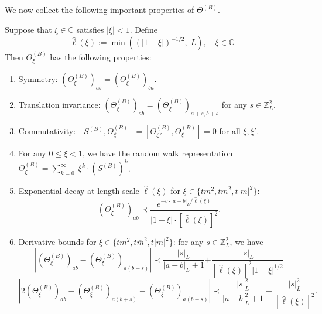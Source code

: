 We now collect the following important properties of $\Theta^{(B)}$. 
\begin{lemma}\label{lem_propTH}
Suppose that  $\xi\in \mathbb C$ satisfies $|\xi|< 1$.  Define
$$
 \hat{\ell}(\xi) := \min\left((|1-\xi|)^{-1/2},\; L\right),\quad \xi\in \mathbb C 
$$
Then  $\Theta^{(B)}_\xi$ has the following properties:
\begin{enumerate}
    \item Symmetry: $ (\Theta^{(B)}_{\xi})_{ab}= (\Theta^{(B)}_{\xi})_{ba}$.
    \item Translation invariance: $
    (\Theta^{(B)}_{\xi})_{ab}= (\Theta^{(B)}_{\xi})_{a+s, b+s}$ for any $s \in \mathbb{Z}_L^2$.
    \item Commutativity: $\left[S^{(B)}, \Theta^{(B)}_{\xi}\right]=\left[\Theta^{(B)}_{\xi\,'}, \Theta^{(B)}_{\xi}\right]=0$ for all $\xi,\xi'$.
    \item For any $ 0 \le \xi < 1$, we have the random walk representation $\Theta_\xi^{(B)}=\sum_{k=0}^{\infty}\;  \xi^k \cdot (S^{(B)})^k$.
     \item Exponential decay at length scale $\hat \ell(\xi) $ for $\xi\in\{tm^{2},t\overline{m}^{2},t|m|^{2}\}$: 
     \begin{equation}\label{prop:ThfadC}     (\Theta^{(B)}_{\xi})_{ab}\prec \frac{e^{-c\cdot|a-b|_{L}\big/ \hat{\ell}(\xi)}}{|1-\xi|\cdot [\hat \ell (\xi)]^{2}}.  
     \end{equation}     
     \item Derivative bounds for $\xi\in\{tm^{2},t\overline{m}^{2},t|m|^{2}\}$: for any $s \in \mathbb{Z}_L^2$, we have 
     \begin{equation}\label{prop:BD1}     
    \left| (\Theta^{(B)}_{\xi})_{ab}-(\Theta^{(B)}_{\xi})_{a(b+s)}\right|\prec \frac{|s|_L}{{|a-b|_{L}+1}}{+\frac{|s|_{L}}{[\hat{\ell}(\xi)]^{2}|1-\xi|^{1/2}}}   
     \end{equation}
     \begin{equation}\label{prop:BD2}     
     \left|2 (\Theta^{(B)}_{\xi})_{ab}-(\Theta^{(B)}_{\xi})_{a(b+s)}-(\Theta^{(B)}_{\xi})_{a(b-s)}\right|\prec  \frac{|s|_L^2}{|a-b|_L^{2}+1 }+{\frac{|s|_{L}^{2}}{[\hat{\ell}(\xi)]^{2}}} . 
     \end{equation}

\end{enumerate}
\end{lemma}

